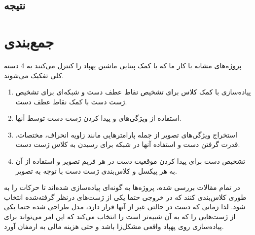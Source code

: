 \subsection{نتیجه}

\cite{hu2020deep}

\section{جمع‌بندی}
پروژه‌های مشابه با کار ما که با کمک پینایی ماشین پهپاد را کنترل می‌‌کنند به 4 دسته کلی تفکیک می‌شوند.
\begin{enumerate}
    \item  پیاده‌سازی با کمک کلاس  برای تشخیص نقاط عطف دست و شبکه‌ای برای تشخیص ژست دست با کمک نقاط عطف دست.
    \item استفاده از ویژگی‌های  و پیدا کردن ژست دست توسط آنها.
    \item استخراج ویژگی‌های تصویر از جمله پارامترهایی مانند زاویه انحراف، مختصات، قدرت گرفتن دست و استفاده آنها در شبکه برای رسیدن به کلاس ژست دست.
    \item تشخیص دست برای پیدا کردن موقعیت دست در هر فریم تصویر و استفاده از آن به هر پیکسل  و کلاس‌بندی ژست دست با توجه به تصویر.
\end{enumerate}

در تمام مقالات بررسی شده، پروژه‌ها به گونه‌ای پیاده‌سازی شده‌اند تا حرکات را به طوری کلاس‌بندی کنند که در خروجی حتما یکی از ژست‌های درنظر گرفته‌شده انتخاب شود. لذا زمانی که دست در حالتی غیر از آنها قرار دارد، مدل طراحی شده حتما یکی از ژست‌هایی را که به آن شبیه‌تر است را انتخاب می‌کند که این امر می‌تواند برای پیاده‌سازی روی پهپاد واقعی مشکل‌زا باشد و حتی هزینه مالی به ارمفان آورد.
